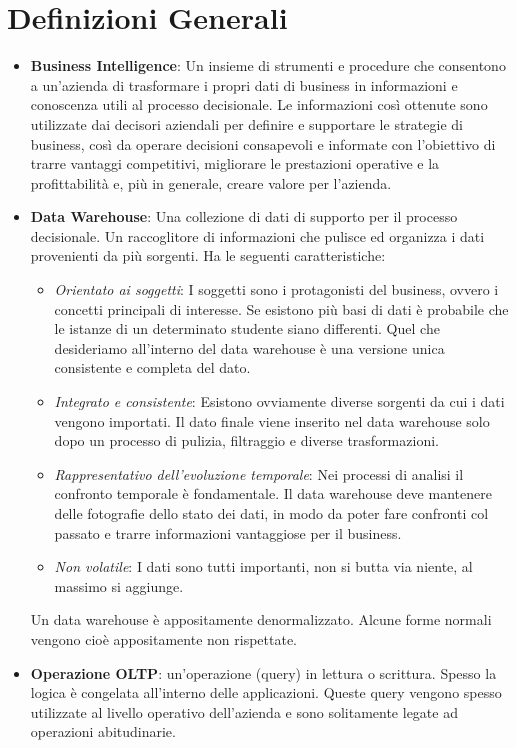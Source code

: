 \section{Definizioni Generali}

\begin{itemize}
	\item \textbf{Business Intelligence}: Un insieme di strumenti e procedure che consentono a un’azienda di trasformare i propri dati di business in informazioni e conoscenza utili al processo decisionale.
	Le informazioni così ottenute sono utilizzate dai decisori aziendali per definire e supportare le strategie di business, così da operare decisioni
	consapevoli e informate con l’obiettivo di trarre vantaggi competitivi, migliorare le prestazioni operative e la profittabilità e, più in generale, creare valore per l’azienda.
	\item \textbf{Data Warehouse}: Una collezione di dati di supporto per il processo decisionale. Un raccoglitore di informazioni che pulisce ed organizza i dati provenienti da più sorgenti. Ha le seguenti caratteristiche:
	\begin{itemize}
		\item \textit{Orientato ai soggetti}: I soggetti sono i protagonisti del business, ovvero i concetti principali di interesse. Se esistono più basi di dati è probabile che le istanze di un determinato studente siano differenti. Quel che desideriamo all'interno del data warehouse è una versione unica consistente e completa del dato.
		\item \textit{Integrato e consistente}: Esistono ovviamente diverse sorgenti da cui i dati vengono importati. Il dato finale viene inserito nel data warehouse solo dopo un processo di pulizia, filtraggio e diverse trasformazioni.
		\item \textit{Rappresentativo dell'evoluzione temporale}: Nei processi di analisi il confronto temporale è fondamentale. Il data warehouse deve mantenere delle fotografie dello stato dei dati, in modo da poter fare confronti col passato e trarre informazioni vantaggiose per il business.
		\item \textit{Non volatile}: I dati sono tutti importanti, non si butta via niente, al massimo si aggiunge.
	\end{itemize}
	Un data warehouse è appositamente denormalizzato. Alcune forme normali vengono cioè appositamente non rispettate.
	\item \textbf{Operazione OLTP}: un'operazione (query) in lettura o scrittura. Spesso la logica è congelata all'interno delle applicazioni. Queste query vengono spesso utilizzate al livello operativo dell'azienda e sono solitamente legate ad operazioni abitudinarie.

\end{itemize}

